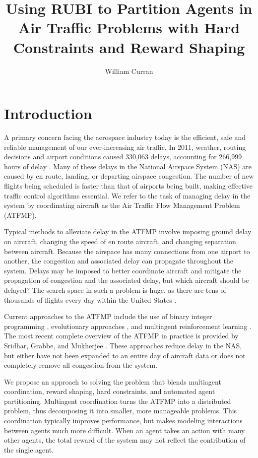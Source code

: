 \documentclass[onehalf,11pt]{beavtex}
\title{Using RUBI to Partition Agents in Air Traffic Problems with Hard Constraints and Reward Shaping}
\author{William Curran}
\begin{document}
\maketitle

\mainmatter

\chapter{Introduction}
A primary concern facing the aerospace industry today is the efficient, safe and reliable management of our ever-increasing air traffic. In 2011, weather, routing decisions and airport conditions caused 330,063 delays, accounting for 266,999 hours of delay \cite{faa05}. Many of these delays in the National Airspace System (NAS) are caused by en route, landing, or departing airspace congestion. The number of new flights being scheduled is faster than that of airports being built, making effective traffic control algorithms essential. We refer to the task of managing delay in the system by coordinating aircraft as the Air Traffic Flow Management Problem (ATFMP). 

Typical methods to alleviate delay in the ATFMP involve imposing ground delay on aircraft, changing the speed of en route aircraft, and changing separation between aircraft. Because the airspace has many connections from one airport to another, the congestion and associated delay can propagate throughout the system. Delays may be imposed to better coordinate aircraft and mitigate the propagation of congestion and the associated delay, but which aircraft should be delayed? The search space in such a problem is huge, as there are tens of thousands of flights every day within the United States \cite{faa05}.

Current approaches to the ATFMP include the use of binary integer programming \cite{Bertsimas}, evolutionary approaches \cite{Rios}, and multiagent reinforcement learning \cite{tumer-agogino_jaamas12}. The most recent complete overview of the ATFMP in practice is provided by Sridhar, Grabbe, and Mukherjee \cite{Sridhar}. These approaches reduce delay in the NAS, but either have not been expanded to an entire day of aircraft data or does not completely remove all congestion from the system. 

We propose an approach to solving the problem that blends multiagent coordination, reward shaping, hard constraints, and automated agent partitioning. Multiagent coordination turns the ATFMP into a distributed problem, thus decomposing it into smaller, more manageable problems. This coordination typically improves performance, but makes modeling interactions between agents much more difficult. When an agent takes an action with many other agents, the total reward of the system may not reflect the contribution of the single agent. 
\end{document}
